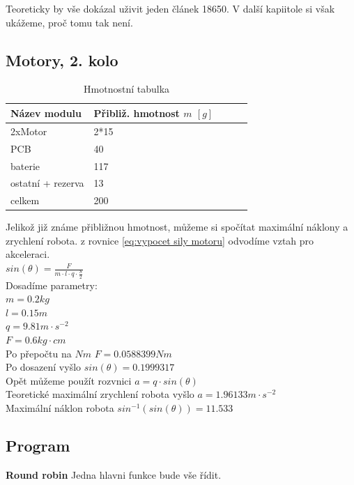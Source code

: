 Teoreticky by vše dokázal uživit jeden článek 18650. V další kapiitole si však ukážeme, proč tomu tak není.

\subsection{Motory, 2. kolo }
\begin{table}[htbp!]
	\centering
	\begin{tabularx}{\textwidth}{|X|X|X|X|X|}\hline
		Název modulu      & Přibliž. hmotnost $m$ $\left[g\right]$ \\ \hline
		2xMotor           & 2*15                                   \\ \hline
		PCB               & 40                                     \\ \hline
		baterie           & 117                                    \\ \hline
		ostatní + rezerva & 13                                     \\ \hline
		celkem            & 200                                    \\ \hline
	\end{tabularx}
	\label{tab:hmotnostni_tabulka}
	\caption{Hmotnostní tabulka}
\end{table}

Jelikož již známe přibližnou hmotnost, můžeme si spočítat maximální náklony a zrychlení robota.
z rovnice \ref{eq:vypocet sily motoru} odvodíme vztah pro akceleraci.\\
$sin(\theta)=\frac{F}{m \cdot l \cdot q \cdot \frac{S}{2}}$\\
Dosadíme parametry:\\
$m = 0.2kg$\\
$l = 0.15m$\\
$q = 9.81m \cdot s^{-2}$\\
$F=0.6kg \cdot cm$\\
Po přepočtu na $Nm$ $F=0.0588399Nm$\\
Po dosazení vyšlo $sin(\theta) = 0.1999317$\\
Opět můžeme použít rozvnici $a = q \cdot sin(\theta)$\\
Teoretické maximální zrychlení robota vyšlo $a = 1.96133 m \cdot s^{-2}$\\
Maximální náklon robota $sin^{-1}(sin(\theta)) = 11.533$ \textdegree

\subsection{Program}
\textbf{Round robin}
Jedna hlavni funkce bude vše řídit.

